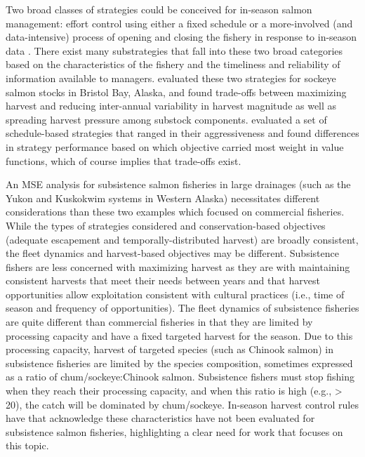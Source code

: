 \documentclass[12pt,]{book}
\theoremstyle{definition}
\theoremstyle{definition}
\theoremstyle{definition}
\theoremstyle{remark}
\begin{document}
Two broad classes of strategies could be conceived for in-season salmon
management: effort control using either a fixed schedule or a
more-involved (and data-intensive) process of opening and closing the
fishery in response to in-season data \citep[i.e., management by
emergency order,][]{adkison-cunningham-2015}. There exist many
substrategies that fall into these two broad categories based on the
characteristics of the fishery and the timeliness and reliability of
information available to managers. \citet{carney-adkison-2014} evaluated
these two strategies for sockeye salmon stocks in Bristol Bay, Alaska,
and found trade-offs between maximizing harvest and reducing
inter-annual variability in harvest magnitude as well as spreading
harvest pressure among substock components. \citet{su-adkison-2002}
evaluated a set of schedule-based strategies that ranged in their
aggressiveness and found differences in strategy performance based on
which objective carried most weight in value functions, which of course
implies that trade-offs exist.

An MSE analysis for subsistence salmon fisheries in large drainages
(such as the Yukon and Kuskokwim systems in Western Alaska) necessitates
different considerations than these two examples which focused on
commercial fisheries. While the types of strategies considered and
conservation-based objectives (adequate escapement and
temporally-distributed harvest) are broadly consistent, the fleet
dynamics and harvest-based objectives may be different. Subsistence
fishers are less concerned with maximizing harvest as they are with
maintaining consistent harvests that meet their needs between years and
that harvest opportunities allow exploitation consistent with cultural
practices (i.e., time of season and frequency of opportunities). The
fleet dynamics of subsistence fisheries are quite different than
commercial fisheries in that they are limited by processing capacity and
have a fixed targeted harvest for the season. Due to this processing
capacity, harvest of targeted species (such as Chinook salmon) in
subsistence fisheries are limited by the species composition, sometimes
expressed as a ratio of chum/sockeye:Chinook salmon. Subsistence fishers
must stop fishing when they reach their processing capacity, and when
this ratio is high (e.g., \textgreater{} 20), the catch will be
dominated by chum/sockeye. In-season harvest control rules have that
acknowledge these characteristics have not been evaluated for
subsistence salmon fisheries, highlighting a clear need for work that
focuses on this topic.
\end{document}
